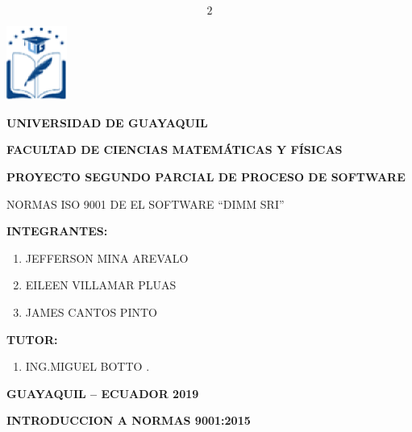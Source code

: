 \documentclass{article} %
\begin{document}

\[2\] 



\noindent \includegraphics*[width=0.78in, height=0.96in, keepaspectratio=false]{image1}

\noindent \textbf{}

\noindent \textbf{UNIVERSIDAD DE GUAYAQUIL}

\noindent \textbf{FACULTAD DE CIENCIAS MATEM\'{A}TICAS Y F\'{I}SICAS}

\noindent \textbf{}

\noindent \textbf{PROYECTO SEGUNDO PARCIAL DE PROCESO DE SOFTWARE}

\noindent NORMAS ISO 9001 DE EL SOFTWARE ``DIMM SRI''

\noindent 

\noindent \textbf{INTEGRANTES:}

\noindent \textbf{}

\begin{enumerate}
\item \textbf{ }JEFFERSON MINA AREVALO

\item  EILEEN VILLAMAR PLUAS

\item  JAMES CANTOS PINTO 
\end{enumerate}

\noindent 

\noindent 

\noindent \textbf{TUTOR:}

\begin{enumerate}
\item \textbf{ }ING.MIGUEL BOTTO .
\end{enumerate}

\noindent 

\noindent \textbf{GUAYAQUIL -- ECUADOR 2019}

\noindent \eject 

\noindent \textbf{INTRODUCCION A NORMAS 9001:2015}
\end{document}
